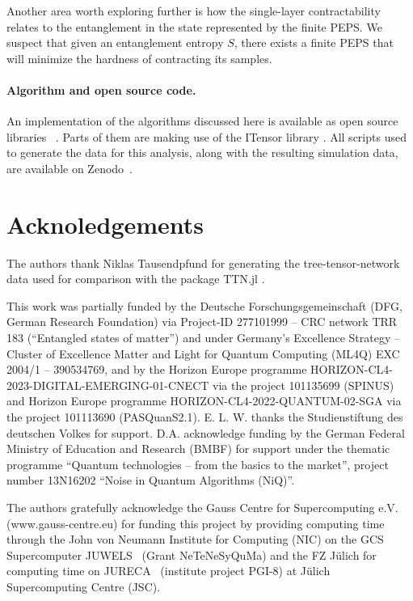 \documentclass[aps,notitlepage,twocolumn,nofootinbib,superscriptaddress,pra,10pt]{revtex4-2}
\begin{document}
Another area worth exploring further is how the single-layer contractability relates to the entanglement in the state represented by the finite PEPS. 
We suspect that given an entanglement entropy $S$, there exists a finite PEPS that will minimize the hardness of contracting its samples.


\paragraph*{Algorithm and open source code.}
An implementation of the algorithms discussed here is available as open source libraries ~\cite{quantumNaturalfPEPS, quantumNaturalgradient}.
Parts of them are making use of the ITensor library \cite{itensor, itensor-r0.3}.
All scripts used to generate the data for this analysis, along with the resulting simulation data, are available on Zenodo~\cite{peps2025zenodo}.


\section{Acknoledgements}

The authors thank Niklas Tausendpfund for generating the tree-tensor-network data used for comparison with the package TTN.jl \cite{TTN.jl}. 

This work was partially funded by the Deutsche Forschungsgemeinschaft (DFG, German Research Foundation) via Project-ID 277101999 -- CRC network TRR 183 (``Entangled states of matter'') and under Germany’s Excellence Strategy – Cluster of Excellence Matter and Light for Quantum Computing (ML4Q) EXC 2004/1 – 390534769,
and by the Horizon Europe programme HORIZON-CL4-2023-DIGITAL-EMERGING-01-CNECT via the project 101135699  (SPINUS) and Horizon Europe programme HORIZON-CL4-2022-QUANTUM-02-SGA via the project 101113690 (PASQuanS2.1).
E. L. W. thanks the Studienstiftung des deutschen Volkes for support. 
D.A. acknowledge funding by the German Federal Ministry of Education and Research (BMBF) for support under the thematic programme ``Quantum technologies -- from the basics to the market'', project number 13N16202 ``Noise in Quantum Algorithms (NiQ)''.

The authors gratefully acknowledge the Gauss Centre for Supercomputing e.V. (www.gauss-centre.eu) for funding this project by providing computing time through the John von Neumann Institute for Computing (NIC) on the GCS Supercomputer JUWELS~\cite{JUWELS} (Grant NeTeNeSyQuMa) and the FZ Jülich for computing time on JURECA~\cite{JURECA2021} (institute project PGI-8) at Jülich Supercomputing Centre (JSC).
\end{document}
